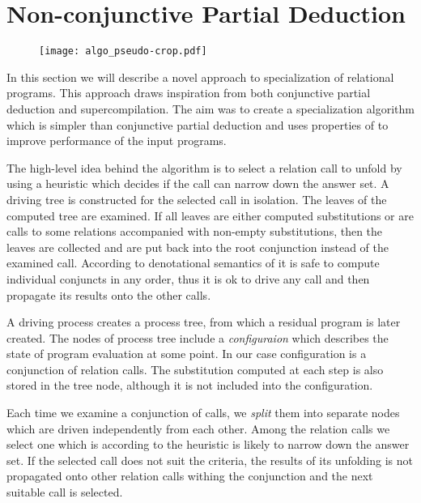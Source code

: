 \section{Non-conjunctive Partial Deduction}

\begin{figure}[!t]
  \centering
  \texttt{[image: algo\_pseudo-crop.pdf]}
  \caption{}
  \label{fig:ncpd-pseudo}
\end{figure}

In this section we will describe a novel approach to specialization of relational programs.
This approach draws inspiration from both conjunctive partial deduction and supercompilation.
The aim was to create a specialization algorithm which is simpler than conjunctive partial deduction and uses properties of \mk{} to improve performance of the input programs.

The high-level idea behind the algorithm is to select a relation call to unfold by using a heuristic which decides if the call can narrow down the answer set.
A driving tree is constructed for the selected call in isolation.
The leaves of the computed tree are examined.
If all leaves are either computed substitutions or are calls to some relations accompanied with non-empty substitutions, then the leaves are collected and are put back into the root conjunction instead of the examined call.
According to denotational semantics of \mk{} it is safe to compute individual conjuncts in any order, thus it is ok to drive any call and then propagate its results onto the other calls.

A driving process creates a process tree, from which a residual program is later created.
The nodes of process tree include a \emph{configuraion} which describes the state of program evaluation at some point.
In our case configuration is a conjunction of relation calls.
The substitution computed at each step is also stored in the tree node, although it is not included into the configuration.

Each time we examine a conjunction of calls, we \emph{split} them into separate nodes which are driven independently from each other.
Among the relation calls we select one which is according to the heuristic is likely to narrow down the answer set.
If the selected call does not suit the criteria, the results of its unfolding is not propagated onto other relation calls withing the conjunction and the next suitable call is selected.

